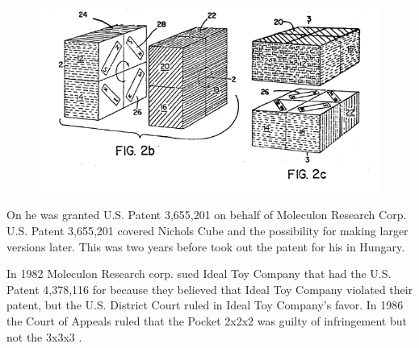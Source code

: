 \begin{figure}[htb]
	\centering
		\includegraphics[scale=0.6]{input/pics/Nicholspatent2.png}
	\caption{}
	\label{fig:Nicholspatent2}
\end{figure}

On  he was granted U.S. Patent 3,655,201 on behalf of Moleculon Research Corp. U.S. Patent 3,655,201 covered Nichols Cube and the possibility for making larger versions later. 
This was two years before \erno{} took out the patent for his \rubik{} in Hungary. 

In 1982 Moleculon Research corp. sued Ideal Toy Company that had the U.S. Patent 4,378,116 for \rubik{} because they believed that Ideal Toy Company violated their patent, but the U.S. District Court ruled in Ideal Toy Company's favor. In 1986 the Court of Appeals ruled that the Pocket \rubik{} 2x2x2 was guilty of infringement but not the 3x3x3 \rubik{}. 

